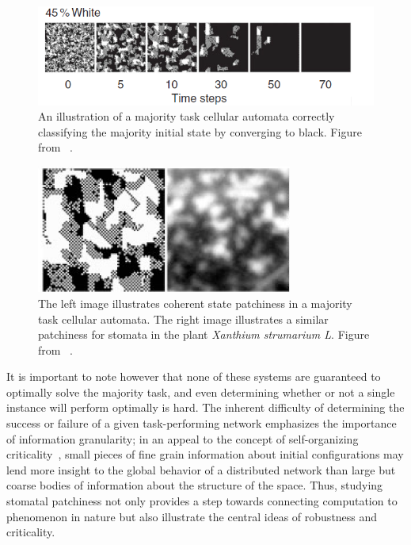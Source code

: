 \documentclass[a4paper,11pt,twoside]{report}
\begin{document}
\begin{figure}[htp]
	\centering
	\includegraphics[width=1.0\textwidth]{mo07_fig3_maj_task.png}
	\caption[Majority Task CA]{
	An illustration of a majority task cellular automata correctly classifying the majority initial state by converging to black. Figure from \citeauthor{mo07}~\cite{mo07}.
	}
	\label{fig:maj_task}
\end{figure}

\begin{figure}[htp]
	\centering
	\includegraphics[width=0.75\textwidth]{me07_fig3_ca_stoma_comparison.png}
	\caption[Qualitative CA-Stomata Comparison]{
	The left image illustrates coherent state patchiness in a majority task cellular automata. The right image illustrates a similar patchiness for stomata in the plant \textit{Xanthium strumarium L}. Figure from \citeauthor{me07}~\cite{me07}.
	}
	\label{fig:ca_stoma}
\end{figure}

It is important to note however that none of these systems are guaranteed to optimally solve the majority task, and even determining whether or not a single instance will perform optimally is hard. The inherent difficulty of determining the success or failure of a given task-performing network emphasizes the importance of information granularity; in an appeal to the concept of self-organizing criticality~\cite{ba88}, small pieces of fine grain information about initial configurations may lend more insight to the global behavior of a distributed network than large but coarse bodies of information about the structure of the space. Thus, studying stomatal patchiness not only provides a step towards connecting computation to phenomenon in nature but also illustrate the central ideas of robustness and criticality.
\end{document}

